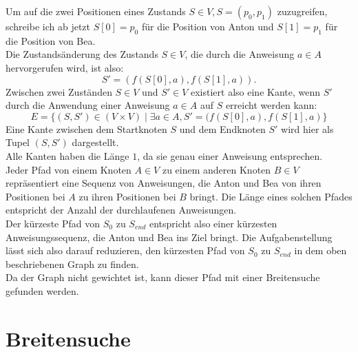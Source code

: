 \documentclass[a4paper,10pt,ngerman]{scrartcl}
\begin{document}
    Um auf die zwei Positionen eines Zustands $S \in V, S = (p_0, p_1)$ zuzugreifen, schreibe ich ab jetzt $S[0] = p_0$ für die Position von Anton und $S[1] = p_1$ für die Position von Bea.\\
    Die Zustandsänderung des Zustands $S \in V$, die durch die Anweisung $a \in A$ hervorgerufen wird, ist also: \[S' = (f(S[0], a), f(S[1], a)).\] Zwischen zwei Zuständen $S \in V$ und $S' \in V$ existiert also eine Kante, wenn $S'$ durch die Anwendung einer Anweisung $a \in A$ auf $S$ erreicht werden kann:
    \[E = \{(S, S') \in (V \times V) \mid \exists a \in A, S' = (f(S[0], a), f(S[1], a)\}\]
    Eine Kante zwischen dem Startknoten $S$ und dem Endknoten $S'$ wird hier als Tupel $(S, S')$ dargestellt.\\
    Alle Kanten haben die Länge $1$, da sie genau einer Anweisung entsprechen. \\
    Jeder Pfad von einem Knoten $A \in V$ zu einem anderen Knoten $B \in V$ repräsentiert eine Sequenz von Anweisungen, die Anton und Bea von ihren Positionen bei $A$ zu ihren Positionen bei $B$ bringt.
    Die Länge eines solchen Pfades entspricht der Anzahl der durchlaufenen Anweisungen.\\
    Der kürzeste Pfad von $S_0$ zu $S_{end}$ entspricht also einer kürzesten Anweisungssequenz, die Anton und Bea ins Ziel bringt. Die Aufgabenstellung lässt sich also darauf reduzieren, den kürzesten Pfad von $S_0$ zu $S_{end}$ in dem oben beschriebenen Graph zu finden. \\
    Da der Graph nicht gewichtet ist, kann dieser Pfad mit einer Breitensuche gefunden werden.\\


    \section{Breitensuche}
\end{document}
